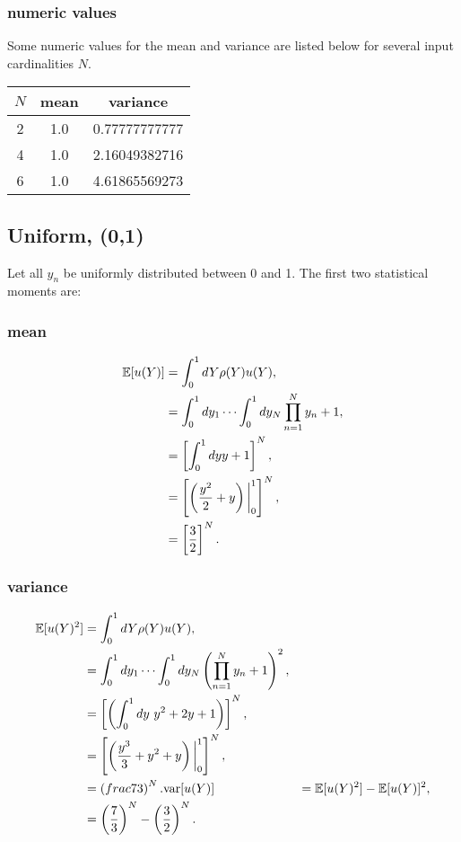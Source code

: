 \subsubsection{numeric values}
Some numeric values for the mean and variance are listed below for several input cardinalities $N$.
\begin{table}[h!]
  \centering
  \begin{tabular}{c|c|c}
    $N$ & mean & variance \\ \hline
    2 & 1.0 & 0.77777777777 \\
    4 & 1.0 & 2.16049382716 \\
    6 & 1.0 & 4.61865569273
  \end{tabular}
\end{table}

\subsection{Uniform, (0,1)}
Let all $y_n$ be uniformly distributed between 0 and 1.  The first two statistical moments are:

\subsubsection{mean}
\begin{align}
\mathbb{E}[ u(Y)] &=\int_{0}^1 dY \rho(Y)u(Y),\\
  &=\int_{0}^1 dy_1\cdots\int_{0}^1 dy_N \prod_{n=1}^N y_n+1,\\
  &=\left[ \int_{0}^1 dy y+1\right]^N,\\
  &=\left[\left(\frac{y^2}{2}+y\right)\bigg|_{0}^1\right]^N,\\
  &=\left[\frac{3}{2}\right]^N.
\end{align}

\subsubsection{variance}
\begin{align}
\mathbb{E}[ u(Y)^2] &= \int_{0}^1 dY \rho(Y)u(Y),\\
  &=\int_{0}^1 dy_1\cdots\int_{0}^1 dy_N \left(\prod_{n=1}^N y_n+1\right)^2,\\
  &=\left[\left(\int_{0}^1 dy\ y^2+2y+1 \right)\right]^N,\\
  &=\left[\left(\frac{y^3}{3}+y^2+y \right)\bigg|_{0}^1 \right]^N,\\
  &=\left(frac{7}{3}\right)^N.
\text{var}[u(Y)] &= \mathbb{E}[ u(Y)^2]-\mathbb{E}[ u(Y)]^2,\\
  &= \left(\frac{7}{3}\right)^N-\left(\frac{3}{2}\right)^N.
\end{align}

